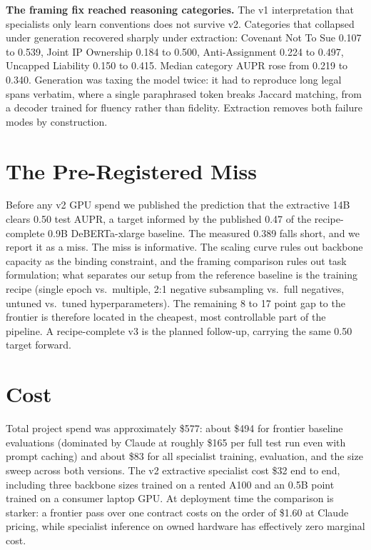 \documentclass[11pt,letterpaper]{article}
\begin{document}
\textbf{The framing fix reached reasoning categories.} The v1 interpretation
that specialists only learn conventions does not survive v2. Categories that
collapsed under generation recovered sharply under extraction: Covenant Not
To Sue 0.107 to 0.539, Joint IP Ownership 0.184 to 0.500, Anti-Assignment
0.224 to 0.497, Uncapped Liability 0.150 to 0.415. Median category AUPR rose
from 0.219 to 0.340. Generation was taxing the model twice: it had to
reproduce long legal spans verbatim, where a single paraphrased token breaks
Jaccard matching, from a decoder trained for fluency rather than fidelity.
Extraction removes both failure modes by construction.

\section{The Pre-Registered Miss}
\label{sec:miss}

Before any v2 GPU spend we published the prediction that the extractive 14B
clears 0.50 test AUPR, a target informed by the published 0.47 of the
recipe-complete 0.9B DeBERTa-xlarge baseline. The measured 0.389 falls short,
and we report it as a miss. The miss is informative. The scaling curve rules
out backbone capacity as the binding constraint, and the framing comparison
rules out task formulation; what separates our setup from the reference
baseline is the training recipe (single epoch vs.\ multiple, 2:1 negative
subsampling vs.\ full negatives, untuned vs.\ tuned hyperparameters). The
remaining 8 to 17 point gap to the frontier is therefore located in the
cheapest, most controllable part of the pipeline. A recipe-complete v3 is the
planned follow-up, carrying the same 0.50 target forward.

\section{Cost}
\label{sec:cost}

Total project spend was approximately \$577: about \$494 for frontier
baseline evaluations (dominated by Claude at roughly \$165 per full test run
even with prompt caching) and about \$83 for all specialist training,
evaluation, and the size sweep across both versions. The v2 extractive
specialist cost \$32 end to end, including three backbone sizes trained on a
rented A100 and an 0.5B point trained on a consumer laptop GPU. At deployment
time the comparison is starker: a frontier pass over one contract costs on
the order of \$1.60 at Claude pricing, while specialist inference on owned
hardware has effectively zero marginal cost.
\end{document}
